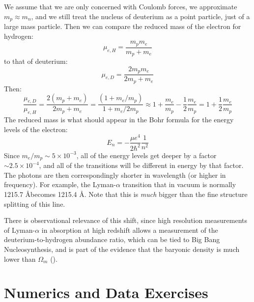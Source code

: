 \begin{enumerate}
\begin{answer}
We assume that we are only concerned with Coulomb forces, we
approximate $m_p \approx m_n$, and we still treat the nucleus of
deuterium as a point particle, just of a large mass particle. Then
we can compare the reduced mass of the electron for hydrogen:
\begin{equation}
\mu_{e, H} = \frac{m_p m_e}{m_p + m_e}
\end{equation}
to that of deuterium:
\begin{equation}
\mu_{e, D} = \frac{2 m_p m_e}{2 m_p + m_e}
\end{equation}
Then:
\begin{equation}
\frac{\mu_{e, D}}{\mu_{e, H}} = \frac{2(m_p + m_e)}{2m_p + m_e}
= \frac{(1 + m_e/m_p)}{1 + m_e / 2 m_p}
\approx 1 + \frac{m_e}{m_p} - \frac{1}{2} \frac{m_e}{m_p}  = 1
+ \frac{1}{2} \frac{m_e}{m_p}
\end{equation}
The reduced mass is what should appear in the Bohr formula for the
energy levels of the electron:
\begin{equation}
E_n = - \frac{\mu e^4}{2 \hbar^2} \frac{1}{n^2}
\end{equation}
Since $m_e/m_p\sim 5\times 10^{-3}$, all of the energy levels get deeper by a
factor $\sim 2.5\times 10^{-4}$, and all of the transitions will be
different in energy by that factor. The photons are then
correspondingly shorter in wavelength (or higher in frequency). For
example, the Lyman-$\alpha$ transition that in vacuum is normally
1215.7 \AA becomes 1215.4 \AA. Note that this is {\it much} bigger
than the fine structure splitting of this line.

There is observational relevance of this shift, since high resolution
measurements of Lyman-$\alpha$ in absorption at high redshift allows a
measurement of the deuterium-to-hydrogen abundance ratio, which can be
tied to Big Bang Nucleosynthesis, and is part of the evidence that the
baryonic density is much lower than $\Omega_m$ (\citealt{burles98a}). 
\end{answer}
\end{enumerate}

\section{Numerics and Data Exercises}

